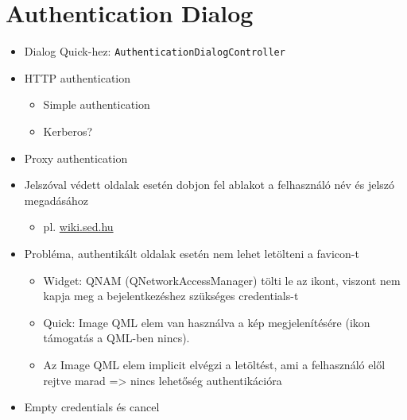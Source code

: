 \documentclass[12pt]{report}
\let\origurl\url
\renewcommand{\url}[1]{%
    \textcolor{blue}{\origurl{#1}}
}
\begin{document}
\section{Authentication Dialog}
\begin{itemize}
    \item Dialog Quick-hez: \texttt{AuthenticationDialogController}
    \item HTTP authentication
        \begin{itemize}
            \item Simple authentication
            \item Kerberos?
        \end{itemize}
    \item Proxy authentication
    \item Jelszóval védett oldalak esetén dobjon fel ablakot a felhasználó név és jelszó
        megadásához
        \begin{itemize}
            \item pl. \url{wiki.sed.hu}
        \end{itemize}
    \item Probléma, authentikált oldalak esetén nem lehet letölteni a favicon-t
        \begin{itemize}
            \item Widget: QNAM (QNetworkAccessManager) tölti le az ikont, viszont nem kapja
                meg a bejelentkezéshez szükséges credentials-t
            \item Quick: Image QML elem van használva a kép megjelenítésére (ikon támogatás a
                QML-ben nincs).
            \item Az Image QML elem implicit elvégzi a letöltést, ami a felhasználó elől
                rejtve marad => nincs lehetőség authentikációra
        \end{itemize}
    \item Empty credentials és cancel
\end{itemize}
\pagebreak
\end{document}
